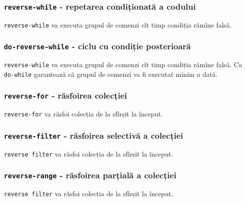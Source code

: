 \subsubsection{\lstinline|reverse-while| - repetarea condiționată a codului}

\lstinline|reverse-while| va executa grupul de comenzi cît timp condiția rămîne falsă.

\subsubsection{\lstinline|do-reverse-while| - ciclu cu condiție posterioară}

\lstinline|reverse-while| va executa grupul de comenzi cît timp condiția rămîne falsă. Ca \lstinline|do-while| garantează că grupul de comenzi va fi executat minim o dată.

\subsubsection{\lstinline|reverse-for| - răsfoirea colecției}

\lstinline|reverse-for| va răsfoi colecția de la sfîrșit la început.

\subsubsection{\lstinline|reverse-filter| - răsfoirea selectivă a colecției}

\lstinline|reverse filter| va răsfoi colecția de la sfîrșit la început.

\subsubsection{\lstinline|reverse-range| - răsfoirea parțială a colecției}

\lstinline|reverse filter| va răsfoi colecția de la sfîrșit la început.

